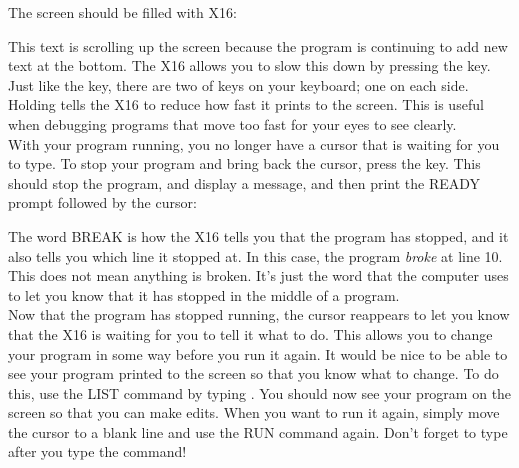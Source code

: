 The screen should be filled with {\ttfamily X16}:\\

\begin{center}
\end{center}

This text is scrolling up the screen because the program is continuing to add
new text at the bottom.  The X16 allows you to slow this down by pressing the
 key.  Just like the \shiftkey key, there are two of \ctrlkey
keys on your keyboard; one on each side.  Holding \ctrlkey tells the X16 to
reduce how fast it prints to the screen.  This is useful when debugging
programs that move too fast for your eyes to see clearly.\\

With your program running, you no longer have a cursor that is waiting for you
to type.  To stop your program and bring back the cursor, press the \runstopkey
key.  This should stop the program, and display a message, and then print the
{\ttfamily READY} prompt followed by the cursor:

\begin{center}
\end{center}

The word {\ttfamily BREAK} is how the X16 tells you that the program has
stopped, and it also tells you which line it stopped at.  In this case, the
program \emph{broke} at line 10.  This does not mean anything is broken.  It's
just the word that the computer uses to let you know that it has stopped in the
middle of a program.\\

Now that the program has stopped running, the cursor reappears to let you know
that the X16 is waiting for you to tell it what to do.  This allows you to
change your program in some way before you run it again.  It would be nice to
be able to see your program printed to the screen so that you know what to
change.  To do this, use the {\ttfamily LIST} command by typing
\returnkey.  You should now see your program on the screen so that you can make
edits.  When you want to run it again, simply move the cursor to a blank line
and use the {\ttfamily RUN} command again.  Don't forget to type
 after you type the command!


